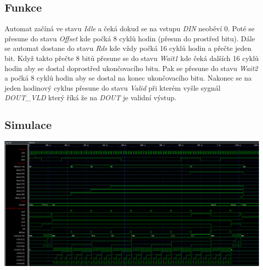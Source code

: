 \documentclass{article}
\begin{document}
\subsection{Funkce}
Automat začíná ve stavu \emph{Idle} a čeká dokud se na vstupu \emph{DIN}
neoběví 0. Poté se přesune do stavu \emph{Offset} kde počká 8 cyklů hodin
(přesun do prostřed bitu). Dále se automat dostane do stavu \emph{Rds} kde vždy
počká 16 cyklů hodin a přečte jeden bit. Když takto přečte 8 bitů přesune se do
stavu \emph{Wait1} kde čeká dalších 16 cyklů hodin aby se dostal doprostřed
ukončovacího bitu. Pak se přesune do stavu \emph{Wait2} a počká 8 cyklů hodin
aby se dostal na konec ukončovacího bitu. Nakonec se na jeden hodinový cyklus
přesune do stavu \emph{Valid} při kterém vyšle sygnál \emph{DOUT\_VLD} který
říká že na \emph{DOUT} je validní výstup.

\begin{landscape}
    \section{Simulace}
    \includegraphics*[scale=0.5751]{assets/simulation.png}
\end{landscape}
\end{document}
